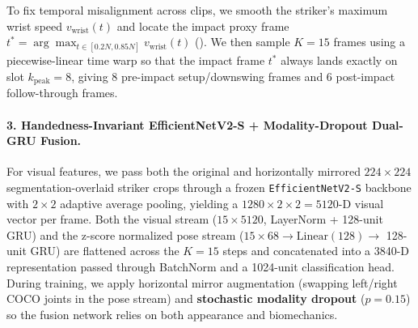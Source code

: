 To fix temporal misalignment across clips, we smooth the striker's maximum wrist speed $v_{\text{wrist}}(t)$ and locate the impact proxy frame $t^* = \arg\max_{t \in [0.2N, 0.85N]} v_{\text{wrist}}(t)$ (). We then sample $K=15$ frames using a piecewise-linear time warp so that the impact frame $t^*$ always lands exactly on slot $k_{\text{peak}} = 8$, giving 8 pre-impact setup/downswing frames and 6 post-impact follow-through frames.

\paragraph{3. Handedness-Invariant EfficientNetV2-S + Modality-Dropout Dual-GRU Fusion.}
For visual features, we pass both the original and horizontally mirrored $224\times224$ segmentation-overlaid striker crops through a frozen \texttt{EfficientNetV2-S} backbone with $2\times2$ adaptive average pooling, yielding a $1280\times2\times2 = 5120$-D visual vector per frame. Both the visual stream ($15\times5120$, LayerNorm + 128-unit GRU) and the z-score normalized pose stream ($15\times68 \rightarrow \text{Linear}(128) \rightarrow$ 128-unit GRU) are flattened across the $K=15$ steps and concatenated into a 3840-D representation passed through BatchNorm and a 1024-unit classification head. During training, we apply horizontal mirror augmentation (swapping left/right COCO joints in the pose stream) and \textbf{stochastic modality dropout} ($p=0.15$) so the fusion network relies on both appearance and biomechanics.

